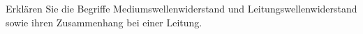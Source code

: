 \begin{question}[section=3,name={Mediumswellenwiderstand},difficulty=,quantity=,type=thr,tags={20131210}]
	Erklären Sie die Begriffe Mediumswellenwiderstand und Leitungswellenwiderstand sowie ihren Zusammenhang bei einer Leitung.
	
	
\end{question}
\begin{solution}
	
\end{solution}